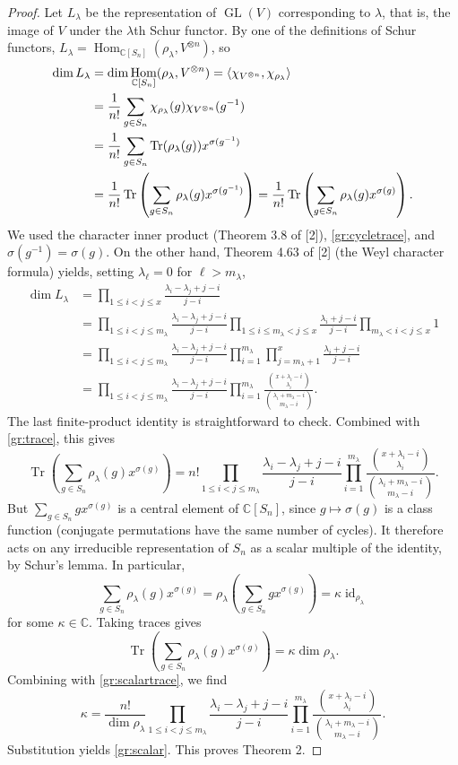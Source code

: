 \documentclass[UTF8,11pt,a4paper]{ctexart}
\theoremstyle{definition}\newtheorem*{definition}{Definition}
\theoremstyle{remark}\newtheorem*{remark}{Remark}
\DeclareMathOperator{\Hom}{Hom}
\DeclareMathOperator{\Tr}{Tr}
\DeclareMathOperator{\id}{id}
\newcommand{\C}{\mathbb C}
\begin{document}
\begin{proof}
Let $L_\lambda$ be the representation of $\operatorname{GL}(V)$ corresponding to $\lambda$, that is, the image of $V$ under the $\lambda$th Schur functor. By one of the definitions of Schur functors,
$L_\lambda=\Hom_{\C[S_n]}(\rho_\lambda,V^{\otimes n})$, so
\begin{align}
\dim L_\lambda
&=\dim\Hom_{\C[S_n]}(\rho_\lambda,V^{\otimes n})
=\langle\chi_{V^{\otimes n}},\chi_{\rho_\lambda}\rangle\notag\\
&=\frac1{n!}\sum_{g\in S_n}\chi_{\rho_\lambda}(g)\chi_{V^{\otimes n}}(g^{-1})\notag\\
&=\frac1{n!}\sum_{g\in S_n}\Tr(\rho_\lambda(g))x^{\sigma(g^{-1})}\notag\\
&=\frac1{n!}\Tr\left(\sum_{g\in S_n}\rho_\lambda(g)x^{\sigma(g^{-1})}\right)
=\frac1{n!}\Tr\left(\sum_{g\in S_n}\rho_\lambda(g)x^{\sigma(g)}\right).\label{gr:trace}
\end{align}
We used the character inner product (Theorem 3.8 of [2]), \eqref{gr:cycletrace}, and $\sigma(g^{-1})=\sigma(g)$.
On the other hand, Theorem 4.63 of [2] (the Weyl character formula) yields, setting $\lambda_\ell=0$ for $\ell>m_\lambda$,
\begin{align*}
\dim L_\lambda
&=\prod_{1\le i<j\le x}\frac{\lambda_i-\lambda_j+j-i}{j-i}\\
&=\prod_{1\le i<j\le m_\lambda}\frac{\lambda_i-\lambda_j+j-i}{j-i}
\prod_{1\le i\le m_\lambda<j\le x}\frac{\lambda_i+j-i}{j-i}
\prod_{m_\lambda<i<j\le x}1\\
&=\prod_{1\le i<j\le m_\lambda}\frac{\lambda_i-\lambda_j+j-i}{j-i}
\prod_{i=1}^{m_\lambda}\prod_{j=m_\lambda+1}^x\frac{\lambda_i+j-i}{j-i}\\
&=\prod_{1\le i<j\le m_\lambda}\frac{\lambda_i-\lambda_j+j-i}{j-i}
\prod_{i=1}^{m_\lambda}
\frac{\binom{x+\lambda_i-i}{\lambda_i}}
{\binom{\lambda_i+m_\lambda-i}{m_\lambda-i}}.
\end{align*}
The last finite-product identity is straightforward to check. Combined with \eqref{gr:trace}, this gives
\begin{equation}\label{gr:scalartrace}
\Tr\left(\sum_{g\in S_n}\rho_\lambda(g)x^{\sigma(g)}\right)
=n!\prod_{1\le i<j\le m_\lambda}\frac{\lambda_i-\lambda_j+j-i}{j-i}
\prod_{i=1}^{m_\lambda}
\frac{\binom{x+\lambda_i-i}{\lambda_i}}
{\binom{\lambda_i+m_\lambda-i}{m_\lambda-i}}.
\end{equation}
But $\sum_{g\in S_n}gx^{\sigma(g)}$ is a central element of $\C[S_n]$, since $g\mapsto\sigma(g)$ is a class function (conjugate permutations have the same number of cycles). It therefore acts on any irreducible representation of $S_n$ as a scalar multiple of the identity, by Schur's lemma. In particular,
\[
\sum_{g\in S_n}\rho_\lambda(g)x^{\sigma(g)}
=\rho_\lambda\left(\sum_{g\in S_n}gx^{\sigma(g)}\right)
=\kappa\id_{\rho_\lambda}
\]
for some $\kappa\in\C$. Taking traces gives
\[
\Tr\left(\sum_{g\in S_n}\rho_\lambda(g)x^{\sigma(g)}\right)=\kappa\dim\rho_\lambda.
\]
Combining with \eqref{gr:scalartrace}, we find
\[
\kappa=\frac{n!}{\dim\rho_\lambda}
\prod_{1\le i<j\le m_\lambda}\frac{\lambda_i-\lambda_j+j-i}{j-i}
\prod_{i=1}^{m_\lambda}
\frac{\binom{x+\lambda_i-i}{\lambda_i}}
{\binom{\lambda_i+m_\lambda-i}{m_\lambda-i}}.
\]
Substitution yields \eqref{gr:scalar}. This proves Theorem 2.
\end{proof}
\end{document}
